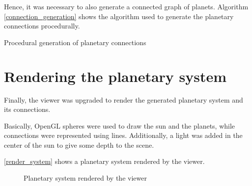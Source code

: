 \documentclass[a4paper,11pt,titlepage,abstract,numbers=noenddot,automark,mnsy,intlimits,rgb,dvipsnames]{report}
\begin{document}
Hence, it was necessary to also generate a connected graph of planets. Algorithm \autoref{connection_generation} shows
the algorithm used to generate the planetary connections procedurally.
\begin{algorithm}[H]
\caption{Procedural generation of planetary connections}
\label{connection_generation}
\begin{algorithmic}
\ENDFOR
\ENDWHILE
\end{algorithmic}
\end{algorithm}
\section{Rendering the planetary system}
Finally, the viewer was upgraded to render the generated planetary system and its connections.

Basically, OpenGL spheres were used to draw the sun and the planets, while connections were represented
using lines. Additionally, a light was added in the center of the sun to give some depth to the scene.

\autoref{render_system} shows a planetary system rendered by the viewer.
\begin{figure}[H]
\noindent{}
\caption{Planetary system rendered by the viewer}
\label{render_system}
\end{figure}
\end{document}
